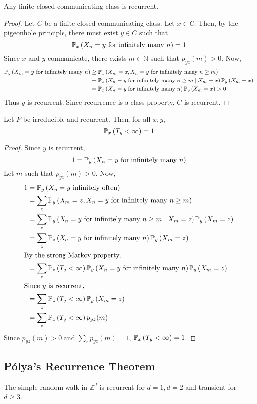 \begin{theorem}
    Any finite closed communicating class is recurrent.
\end{theorem}
\begin{proof}
    Let \( C \) be a finite closed communicating class.
    Let \( x \in C \).
    Then, by the pigeonhole principle, there must exist \( y \in C \) such that
    \[ \mathbb{P}_{x}\left({X_n = y \text{ for infinitely many } n}\right) = 1 \]
    Since \( x \) and \( y \) communicate, there exists \( m \in \mathbb N \) such that \( p_{yx}(m) > 0 \).
    Now,
    \begin{align*}
        \mathbb{P}_{y}\left({X_m = y \text{ for infinitely many } n}\right) &\geq \mathbb{P}_{x}\left({X_m = x, X_n = y \text{ for infinitely many } n \geq m}\right) \\
        &=\mathbb{P}_{x}\left({X_n = y \text{ for infinitely many } n \geq m \mid X_m = x}\right) \mathbb{P}_{y}\left({X_m = x}\right) \\
        &=\mathbb{P}_{x}\left({X_n = y \text{ for infinitely many } n}\right) \mathbb{P}_{y}\left({X_m = x}\right) > 0
    \end{align*}
    Thus \( y \) is recurrent.
    Since recurrence is a class property, \( C \) is recurrent.
\end{proof}
\begin{theorem}
    Let \( P \) be irreducible and recurrent.
    Then, for all \( x, y \),
    \[ \mathbb{P}_{x}\left({T_y < \infty}\right) = 1 \]
\end{theorem}
\begin{proof}
    Since \( y \) is recurrent,
    \[ 1 = \mathbb{P}_{y}\left({X_n = y \text{ for infinitely many } n}\right) \]
    Let \( m \) such that \( p_{yx}(m) > 0 \).
    Now,
    \begin{align*}
        1 &= \mathbb{P}_{y}\left({X_n = y \text{ infinitely often}}\right) \\
        &= \sum_z \mathbb{P}_{y}\left({X_m = z, X_n = y \text{ for infinitely many } n \geq m}\right) \\
        &= \sum_z \mathbb{P}_{y}\left({X_n = y \text{ for infinitely many } n \geq m \mid X_m = z}\right) \mathbb{P}_{y}\left({X_m = z}\right) \\
        &= \sum_z \mathbb{P}_{z}\left({X_n = y \text{ for infinitely many } n}\right) \mathbb{P}_{y}\left({X_m = z}\right) \\
        \intertext{By the strong Markov property,}
        &= \sum_z \mathbb{P}_{z}\left({T_y < \infty}\right) \mathbb{P}_{y}\left({X_n = y \text{ for infinitely many } n}\right) \mathbb{P}_{y}\left({X_m = z}\right) \\
        \intertext{Since \( y \) is recurrent,}
        &= \sum_z \mathbb{P}_{z}\left({T_y < \infty}\right) \mathbb{P}_{y}\left({X_m = z}\right) \\
        &= \sum_z \mathbb{P}_{z}\left({T_y < \infty}\right) p_{yz}(m)
    \end{align*}
    Since \( p_{yz}(m) > 0 \) and \( \sum_z p_{yz}(m) = 1 \), \( \mathbb{P}_{x}\left({T_y < \infty}\right) = 1 \).
\end{proof}

\subsection{P\'olya's Recurrence Theorem}
\begin{theorem}
    The simple random walk in \( \mathbb Z^d \) is recurrent for \( d = 1, d = 2 \) and transient for \( d \geq 3 \).
\end{theorem}
